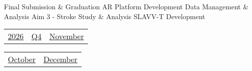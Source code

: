 \vfill{\centering{} \small{Final Submission \& Graduation}\hspace{1.5em} \small{AR Platform Development}\hspace{1.5em} \small{Data Management \& Analysis}\hspace{1.5em} \small{Aim 3 - Stroke Study \& Analysis}\hspace{1.5em} \small{SLAVV-T Development}\hspace{1.5em}\par}

\pagebreak
{\noindent\Large\renewcommand{\arraystretch}{\myNumArrayStretch}\begin{tabular}{|l|l|l}
\hyperlink{2026}{2026} & \hyperlink{Q4}{Q4} & \hyperlink{November}{November}
\end{tabular}\hfill%
\begin{tabular}{r|r@{}}
\hyperlink{month-2026-10}{October} & \hyperlink{month-2026-12}{December}
\end{tabular}}
\myLineThick
